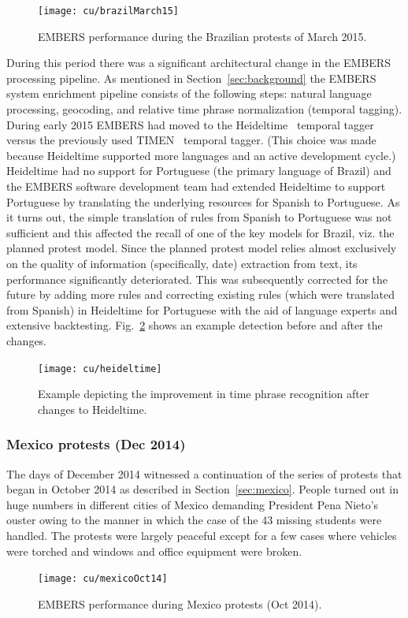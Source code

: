 \begin{figure}
\centering
\texttt{[image: cu/brazilMarch15]}
\caption{EMBERS performance during the Brazilian protests of March 2015.}
\label{fig:brazilSpring}
\end{figure}

During this period there was a significant architectural change in the
EMBERS processing pipeline. As mentioned in Section~\ref{sec:background} the
EMBERS system enrichment pipeline consists of the following steps: natural language processing,
geocoding, and relative time phrase normalization (temporal tagging). During early 2015
EMBERS had moved to the Heideltime~\cite{heideltime} temporal
tagger versus the previously used TIMEN~\cite{timen} temporal tagger. (This
choice was made because
Heideltime supported more languages and an active development cycle.)
Heideltime had no support for Portuguese (the primary
language of Brazil) and the EMBERS software development team had 
extended Heideltime to
support Portuguese by translating the underlying
resources for Spanish to Portuguese. As it turns out,
the simple translation of rules from Spanish to Portuguese
was not sufficient and this affected the recall of one of the key models
for Brazil, viz. the planned protest model.
Since the planned protest model relies
almost exclusively on the quality of information (specifically, date) extraction from text,
its performance significantly deteriorated.
This was subsequently corrected for the future by adding
more rules and correcting existing rules (which were translated from
Spanish) in Heideltime for Portuguese with the aid of language experts and
extensive backtesting. Fig.~\ref{fig:heideltime} shows an example
detection before and after the changes.

\begin{figure}
  \centering
\texttt{[image: cu/heideltime]}
\caption{Example depicting the improvement in time phrase
recognition after changes to
Heideltime.}
\label{fig:heideltime}
\end{figure}

\subsubsection{Mexico protests (Dec 2014)}
The days of December 2014 witnessed a continuation of the series of protests that began in October 2014
as described in Section~\ref{sec:mexico}. People turned out in huge numbers in different cities of Mexico demanding
President Pena Nieto's ouster owing to the manner in which the case of the 43 missing students were handled.
The protests were largely peaceful except for a few cases where vehicles were torched and windows and office equipment
were broken.
\begin{figure} %
\centering
\texttt{[image: cu/mexicoOct14]}
\caption{EMBERS performance during Mexico protests (Oct 2014).}
\label{fig:mexicoOct14}
\end{figure}

